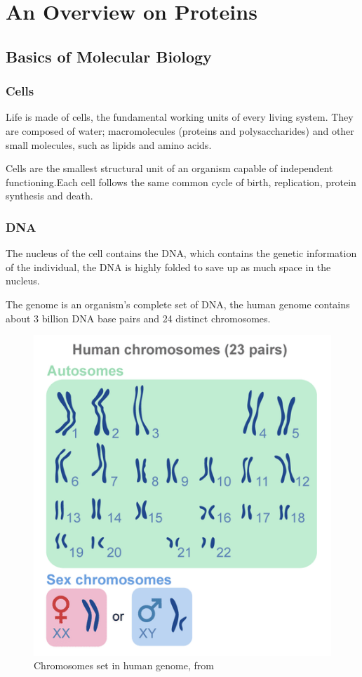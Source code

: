 \chapter{An Overview on Proteins}
\label{chp:proteins}

\section{Basics of Molecular Biology}
\subsection{Cells}
Life is made of cells, the fundamental working units of every living system. They are composed of water; macromolecules (proteins and polysaccharides) and other small molecules, such as lipids and amino acids. 

Cells are the smallest structural unit of an organism capable of independent functioning.Each cell follows the same common cycle of birth, replication, protein synthesis and death. 

\subsection{DNA}
The nucleus of the cell contains the DNA, which contains the genetic information of the individual, the DNA is highly folded to save up as much space in the nucleus.

The genome is an organism's complete set of DNA, the human genome contains about 3 billion DNA base pairs and 24 distinct chromosomes.  

\begin{figure}[h]
	\includegraphics[scale=0.8]{res/proteins_overview/chromosomes.png}
	\caption{Chromosomes set in human genome, from \cite{chromosomes}}
	\label{fig:chromosomes}
\end{figure}

